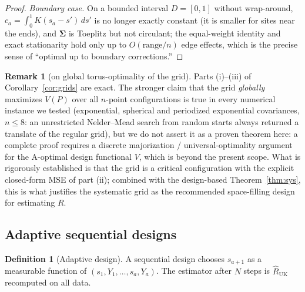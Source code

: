 \documentclass{amsart}
\theoremstyle{definition}
\newtheorem{definition}[theorem]{Definition}
\newtheorem{remark}[theorem]{Remark}
\newcommand{\Rhat}{\widehat R}
\begin{document}
\begin{proof}
\emph{Boundary case.} On a bounded interval $D=[0,1]$ without wrap-around,
$c_a=\int_0^1 K(s_a-s')\,ds'$ is no longer exactly constant (it is smaller
for sites near the ends), and $\boldsymbol\Sigma$ is Toeplitz but not
circulant; the equal-weight identity and exact stationarity hold only up to
$O(\text{range}/n)$ edge effects, which is the precise sense of ``optimal up
to boundary corrections.''
\end{proof}

\begin{remark}[on global torus-optimality of the grid]\label{rem:gridglobal}
Parts (i)--(iii) of Corollary~\ref{cor:grids} are exact. The stronger claim
that the grid \emph{globally} maximizes $V(P)$ over all $n$-point
configurations is true in every numerical instance we tested (exponential,
spherical and periodized exponential covariances, $n\le 8$: an unrestricted
Nelder--Mead search from random starts always returned a translate of the
regular grid), but we do not assert it as a proven theorem here: a complete
proof requires a discrete majorization / universal-optimality argument for
the A-optimal design functional $V$, which is beyond the present scope.
What is rigorously established is that the grid is a critical configuration
with the explicit closed-form MSE of part (ii); combined with the
design-based Theorem~\ref{thm:sys}, this is what justifies the systematic
grid as the recommended space-filling design for estimating $R$.
\end{remark}

\subsection{Adaptive sequential designs}\label{ssec:adaptive}

\begin{definition}[Adaptive design]
A sequential design chooses $s_{a+1}$ as a measurable function of
$(s_1,Y_1,\dots,s_a,Y_a)$. The estimator after $N$ steps is
$\Rhat_{\mathrm{UK}}$ recomputed on all data.
\end{definition}
\end{document}
